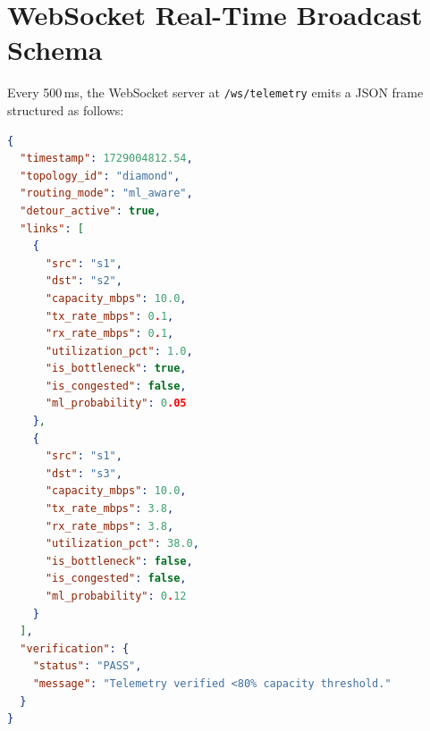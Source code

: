 \section{WebSocket Real-Time Broadcast Schema}
Every 500\,ms, the WebSocket server at \texttt{/ws/telemetry} emits a JSON frame structured as follows:

\begin{lstlisting}[language=json,caption={Real-time WebSocket telemetry JSON frame.}]
{
  "timestamp": 1729004812.54,
  "topology_id": "diamond",
  "routing_mode": "ml_aware",
  "detour_active": true,
  "links": [
    {
      "src": "s1",
      "dst": "s2",
      "capacity_mbps": 10.0,
      "tx_rate_mbps": 0.1,
      "rx_rate_mbps": 0.1,
      "utilization_pct": 1.0,
      "is_bottleneck": true,
      "is_congested": false,
      "ml_probability": 0.05
    },
    {
      "src": "s1",
      "dst": "s3",
      "capacity_mbps": 10.0,
      "tx_rate_mbps": 3.8,
      "rx_rate_mbps": 3.8,
      "utilization_pct": 38.0,
      "is_bottleneck": false,
      "is_congested": false,
      "ml_probability": 0.12
    }
  ],
  "verification": {
    "status": "PASS",
    "message": "Telemetry verified <80% capacity threshold."
  }
}
\end{lstlisting}
